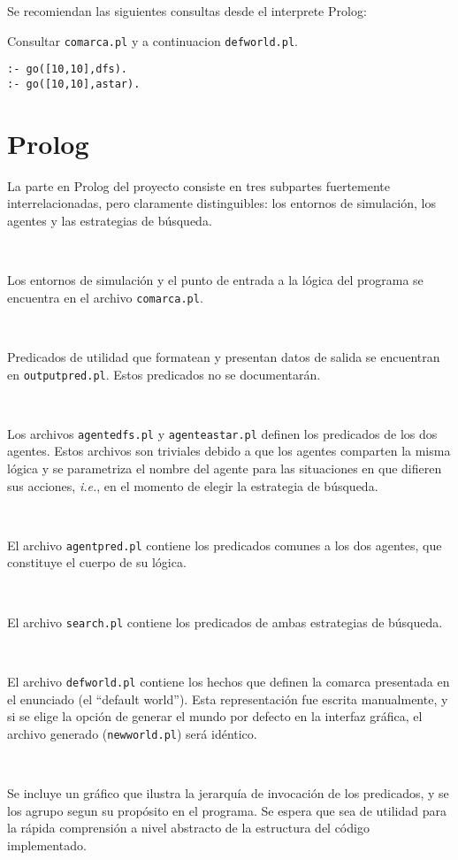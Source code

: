 \documentclass[a4paper,12pt]{report}
\begin{document}
Se recomiendan las siguientes consultas desde el interprete Prolog:

Consultar \texttt{comarca.pl} y a continuacion \texttt{defworld.pl}.
\begin{verbatim}
:- go([10,10],dfs).
:- go([10,10],astar).
\end{verbatim}

\chapter{Prolog}

La parte en Prolog del proyecto consiste en tres subpartes fuertemente interrelacionadas, pero claramente
distinguibles: los entornos de simulaci\'{o}n, los agentes y las estrategias de b\'{u}squeda.

\

Los entornos de simulaci\'{o}n y el punto de entrada a la l\'{o}gica del programa se encuentra en el archivo
\texttt{comarca.pl}.

\

Predicados de utilidad que formatean y presentan datos de salida se encuentran en \texttt{outputpred.pl}.
Estos predicados no se documentar\'{a}n.

\

Los archivos \texttt{agentedfs.pl} y \texttt{agenteastar.pl} definen los predicados de los dos agentes.
Estos archivos son triviales debido a que los agentes comparten la misma l\'{o}gica y se parametriza el nombre del agente
para las situaciones en que difieren sus acciones, \textit{i.e.}, en el momento de elegir la estrategia de b\'{u}squeda.

\

El archivo \texttt{agentpred.pl} contiene los predicados comunes a los dos agentes, que constituye el cuerpo de su
l\'{o}gica.

\

El archivo \texttt{search.pl} contiene los predicados de ambas estrategias de b\'{u}squeda.

\

El archivo \texttt{defworld.pl} contiene los hechos que definen la comarca presentada en el enunciado (el ``default
world''). Esta representaci\'{o}n fue escrita manualmente, y si se elige la opci\'{o}n de generar el mundo por defecto en
la interfaz gr\'{a}fica, el archivo generado (\texttt{newworld.pl}) ser\'{a} id\'{e}ntico.

\

Se incluye un gr\'{a}fico que ilustra la jerarqu\'{i}a de invocaci\'{o}n de los predicados, y se los agrupo segun su
prop\'{o}sito en el programa. Se espera que sea de utilidad para la r\'{a}pida comprensi\'{o}n a nivel abstracto de la
estructura del c\'{o}digo implementado.
\end{document}
